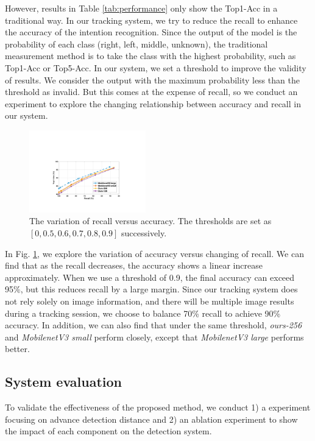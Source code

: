 \documentclass[journal]{IEEEtran}
\begin{document}
However, results in Table \ref{tab:performance} only show the Top1-Acc in a traditional way. In our tracking system, we try to reduce the recall to enhance the accuracy of the intention recognition. 
Since the output of the model is the probability of each class (right, left, middle, unknown), the traditional measurement method is to take the class with the highest probability, such as Top1-Acc or Top5-Acc. 
In our system, we set a threshold to improve the validity of results. We consider the output with the maximum probability less than the threshold as invalid.
But this comes at the expense of recall, so we conduct an experiment to explore the changing relationship between accuracy and recall in our system.

\begin{figure}[htbp]
    \centerline{\includegraphics[width=0.45\textwidth]{fig/recall_dec.pdf}}
    \caption{The variation of recall versus accuracy. The thresholds are set as $[0, 0.5, 0.6, 0.7, 0.8, 0.9 ] $ successively.}
    \label{fig:recall_dec}
\end{figure}

In Fig. \ref{fig:recall_dec}, we explore the variation of accuracy versus changing of recall. We can find that as the recall decreases, the accuracy shows a linear increase approximately. When we use a threshold of 0.9, the final accuracy can exceed 95\%, but this reduces recall by a large margin. Since our tracking system does not rely solely on image information, and there will be multiple image results during a tracking session, we choose to balance 70\% recall to achieve 90\% accuracy.
In addition, we can also find that under the same threshold, \textit{ours-256} and \textit{MobilenetV3 small} perform closely, except that \textit{MobilenetV3 large} performs better.

\subsection{System evaluation}
To validate the effectiveness of the proposed method, we conduct 1) a experiment focusing on advance detection distance and 2) an ablation experiment to show the impact of each component on the detection system.
\end{document}
